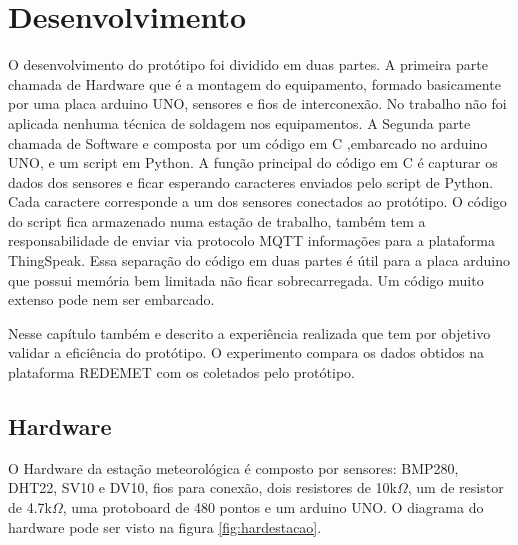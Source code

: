 \chapter{Desenvolvimento} \label{desenvolvimento}

O desenvolvimento do protótipo foi dividido em duas partes. A primeira parte chamada de Hardware que é a montagem do equipamento, formado basicamente por uma placa arduino UNO, sensores e fios de interconexão. No trabalho não foi aplicada nenhuma técnica de soldagem nos equipamentos. A Segunda parte chamada de Software e composta por um código em C ,embarcado no arduino UNO, e um script em Python. A função principal do código em C é capturar os dados dos sensores e ficar esperando caracteres enviados pelo script de Python. Cada caractere corresponde a um dos sensores conectados ao protótipo. O código do script fica armazenado numa estação de trabalho, também tem a responsabilidade de enviar via protocolo MQTT informações para a plataforma ThingSpeak. Essa separação do código em duas partes é útil para a placa arduino que possui memória bem limitada não ficar sobrecarregada. Um código muito extenso pode nem ser embarcado.


Nesse capítulo também e descrito a experiência realizada que tem por objetivo validar a eficiência do protótipo. O experimento compara os dados obtidos na plataforma REDEMET com os coletados pelo protótipo. 

\section{Hardware}

O Hardware da estação meteorológica é composto por sensores: BMP280, DHT22, SV10 e DV10, fios para conexão, dois resistores de 10k$\Omega$, um de resistor de 4.7k$\Omega$, uma protoboard de 480 pontos e um arduino UNO. O diagrama do hardware pode ser visto na figura \ref{fig:hardestacao}.

